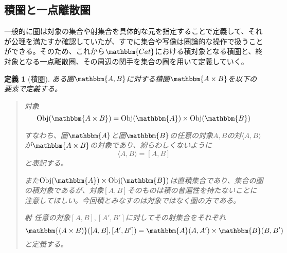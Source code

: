 \documentclass[uplatex,dvipdfmx]{jsarticle}
\newcommand{\cat}[1]{\mathbbm{#1}}
\newcommand{\tuple}[1]{\langle #1\rangle}
\newcommand{\obj}[1]{\mathrm{Obj}(\cat{#1})}
\newcommand{\arset}[3]{\cat{#1}(#2,#3)}
\newcommand{\pcobj}[1]{[#1]}
\newtheorem{define}[proof]{定義}
\numberwithin{proof}{subsection}
\newenvironment{mydescription}
{\begin{description}
  \setlength{\parskip}{0.5cm}
}
{\end{description}}
\begin{document}
	\subsection{積圏と一点離散圏}
  一般的に圏は対象の集合や射集合を具体的な元を指定することで定義して、それが公理を満たすか確認していたが、すでに集合や写像は圏論的な操作で扱うことができる。そのため、これから$\cat{Cat}$における積対象となる積圏と、終対象となる一点離散圏、その周辺の関手を集合の圏を用いて定義していく。
	\begin{define}[積圏]
		ある圏$\cat{A,B}$に対する積圏$\cat{A\times B}$を以下の要素で定義する。
		\begin{quote}
			\begin{mydescription}
				\item[対象] \[\obj{A\times B}=\obj{A}\times\obj{B}\]

				すなわち、圏$\cat{A}$と圏$\cat{B}$の任意の対象$A,B$の対$\tuple{A,B}$が$\cat{A\times B}$の対象であり、紛らわしくないように\[\tuple{A,B}=\pcobj{A,B}\]と表記する。

				また$\obj{A}\times\obj{B}$は直積集合であり、集合の圏の積対象であるが、対象$\pcobj{A,B}$そのものは積の普遍性を持たないことに注意してほしい。今回積とみなすのは対象ではなく圏の方である。
				\item[射]任意の対象$\pcobj{A,B},\pcobj{A',B'}$に対してその射集合をそれぞれ\[\arset{(A\times B)}{\pcobj{A,B}}{\pcobj{A',B'}}=\arset{A}{A}{A'}\times\arset{B}{B}{B'}\]と定義する。


\end{mydescription}
\end{quote}
\end{define}
\end{document}
